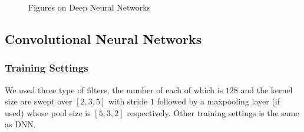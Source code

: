 \documentclass{article}
\begin{document}
				\begin{figure}[htbp]
					\centering
					\caption{\label{fig:dnn-proc}Figures on Deep Neural Networks}
				\end{figure}
		\subsection{Convolutional Neural Networks}
			\subsubsection*{Training Settings}
				We used three type of filters, the number of each of which is $128$ and the kernel size are swept over $[2, 3, 5]$ with stride $1$ followed by a maxpooling layer (if used) whose pool size is $[5, 3, 2]$ respectively.  Other training settings is the same as DNN.
\end{document}
